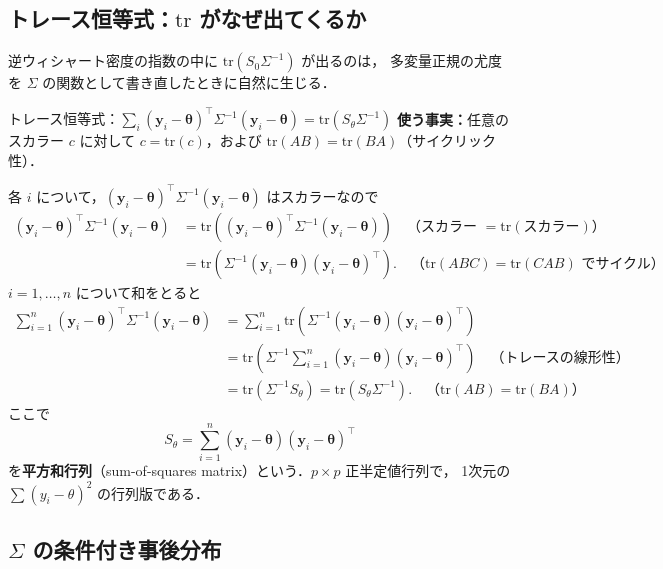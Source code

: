 \documentclass[lualatex,ja=standard,a4paper,12pt]{bxjsarticle}
\newcommand{\tr}{\mathrm{tr}}
\begin{document}
\subsection{トレース恒等式：$\tr$ がなぜ出てくるか}

逆ウィシャート密度の指数の中に $\tr(S_0\Sigma^{-1})$ が出るのは，
多変量正規の尤度を $\Sigma$ の関数として書き直したときに自然に生じる．

\begin{derivbox}{トレース恒等式：$\sum_i (\bm{y}_i - \bm{\theta})^\top \Sigma^{-1}(\bm{y}_i - \bm{\theta}) = \tr(S_\theta \Sigma^{-1})$}
\textbf{使う事実：}任意のスカラー $c$ に対して $c = \tr(c)$，および $\tr(AB) = \tr(BA)$（サイクリック性）．

各 $i$ について，$(\bm{y}_i - \bm{\theta})^\top \Sigma^{-1}(\bm{y}_i - \bm{\theta})$ はスカラーなので
\begin{align*}
  (\bm{y}_i - \bm{\theta})^\top \Sigma^{-1}(\bm{y}_i - \bm{\theta})
  &= \tr\!\left((\bm{y}_i - \bm{\theta})^\top \Sigma^{-1}(\bm{y}_i - \bm{\theta})\right)
    \quad\text{（スカラー $= \tr(\text{スカラー})$）}\\
  &= \tr\!\left(\Sigma^{-1}(\bm{y}_i - \bm{\theta})(\bm{y}_i - \bm{\theta})^\top\right).
    \quad\text{（$\tr(ABC) = \tr(CAB)$ でサイクル）}
\end{align*}
$i = 1, \ldots, n$ について和をとると
\begin{align*}
  \sum_{i=1}^n (\bm{y}_i - \bm{\theta})^\top \Sigma^{-1}(\bm{y}_i - \bm{\theta})
  &= \sum_{i=1}^n \tr\!\left(\Sigma^{-1}(\bm{y}_i - \bm{\theta})(\bm{y}_i - \bm{\theta})^\top\right) \\
  &= \tr\!\left(\Sigma^{-1} \sum_{i=1}^n (\bm{y}_i - \bm{\theta})(\bm{y}_i - \bm{\theta})^\top\right)
    \quad\text{（トレースの線形性）} \\
  &= \tr\!\left(\Sigma^{-1} S_\theta\right)
  = \tr\!\left(S_\theta \Sigma^{-1}\right).
    \quad\text{（$\tr(AB) = \tr(BA)$）}
\end{align*}
ここで
\[
  S_\theta = \sum_{i=1}^n (\bm{y}_i - \bm{\theta})(\bm{y}_i - \bm{\theta})^\top
\]
を\textbf{平方和行列}（sum-of-squares matrix）という．$p\times p$ 正半定値行列で，
1次元の $\sum(y_i - \theta)^2$ の行列版である．
\end{derivbox}

\subsection{$\Sigma$ の条件付き事後分布}
\end{document}

